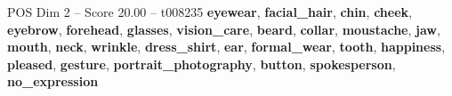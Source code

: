\begin{textsample}{POS Dim 2 – Score 20.00 – t008235}  \label{ex:f2_pos_032}
\textbf{eyewear}, \textbf{facial\_hair}, \textbf{chin}, \textbf{cheek}, \textbf{eyebrow}, \textbf{forehead}, \textbf{glasses}, \textbf{vision\_care}, \textbf{beard}, \textbf{collar}, \textbf{moustache}, \textbf{jaw}, \textbf{mouth}, \textbf{neck}, \textbf{wrinkle}, \textbf{dress\_shirt}, \textbf{ear}, \textbf{formal\_wear}, \textbf{tooth}, \textbf{happiness}, \textbf{pleased}, \textbf{gesture}, \textbf{portrait\_photography}, \textbf{button}, \textbf{spokesperson}, \textbf{no\_expression}

\end{textsample}

